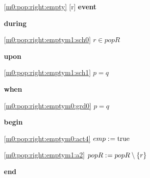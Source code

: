 \noindent \ref{m0:pop:right:empty} [r] \textbf{event}
\begin{block}
  \item   \textbf{during}
  \begin{block}
  \item[ \eqref{m0:pop:right:emptym1:sch0} ]$r \in popR $ %
  \end{block}
  \item   \textbf{upon}
  \begin{block}
  \item[ \eqref{m0:pop:right:emptym1:sch1} ]$p = q $ %
  \end{block}
  \item   \textbf{when}
  \begin{block}
  \item[ \eqref{m0:pop:right:emptym0:grd0} ]$p = q $ %
  \end{block}
  \item   \textbf{begin}
  \begin{block}
  \item[ \eqref{m0:pop:right:emptym0:act4} ]$emp \mathrel{:\mkern1mu=} \text{true} $ %
  \item[ \eqref{m0:pop:right:emptym1:a2} ]$popR \mathrel{:\mkern1mu=} popR \setminus \{ r \} $ %
  \end{block}
  \item   \textbf{end} \\
\end{block}

